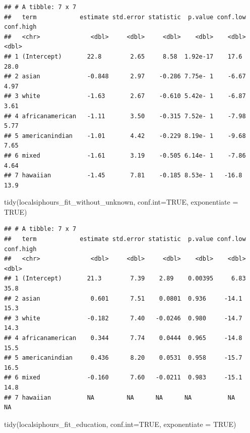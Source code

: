 \documentclass[
  11 pt,
]{article}
\newenvironment{Shaded}{\begin{snugshade}}{\end{snugshade}}
\newcommand{\AttributeTok}[1]{\textcolor[rgb]{0.77,0.63,0.00}{#1}}
\newcommand{\ConstantTok}[1]{\textcolor[rgb]{0.00,0.00,0.00}{#1}}
\newcommand{\FunctionTok}[1]{\textcolor[rgb]{0.00,0.00,0.00}{#1}}
\newcommand{\NormalTok}[1]{#1}
\begin{document}
\begin{verbatim}
## # A tibble: 7 x 7
##   term            estimate std.error statistic  p.value conf.low conf.high
##   <chr>              <dbl>     <dbl>     <dbl>    <dbl>    <dbl>     <dbl>
## 1 (Intercept)       22.8        2.65     8.58  1.92e-17    17.6      28.0 
## 2 asian             -0.848      2.97    -0.286 7.75e- 1    -6.67      4.97
## 3 white             -1.63       2.67    -0.610 5.42e- 1    -6.87      3.61
## 4 africanamerican   -1.11       3.50    -0.315 7.52e- 1    -7.98      5.77
## 5 americanindian    -1.01       4.42    -0.229 8.19e- 1    -9.68      7.65
## 6 mixed             -1.61       3.19    -0.505 6.14e- 1    -7.86      4.64
## 7 hawaiian          -1.45       7.81    -0.185 8.53e- 1   -16.8      13.9
\end{verbatim}

\begin{Shaded}
\begin{Highlighting}[]
\FunctionTok{tidy}\NormalTok{(localsiphours\_fit\_without\_unknown, }\AttributeTok{conf.int=}\ConstantTok{TRUE}\NormalTok{, }\AttributeTok{exponentiate =} \ConstantTok{TRUE}\NormalTok{)}
\end{Highlighting}
\end{Shaded}

\begin{verbatim}
## # A tibble: 7 x 7
##   term            estimate std.error statistic  p.value conf.low conf.high
##   <chr>              <dbl>     <dbl>     <dbl>    <dbl>    <dbl>     <dbl>
## 1 (Intercept)       21.3        7.39    2.89    0.00395     6.83      35.8
## 2 asian              0.601      7.51    0.0801  0.936     -14.1       15.3
## 3 white             -0.182      7.40   -0.0246  0.980     -14.7       14.3
## 4 africanamerican    0.344      7.74    0.0444  0.965     -14.8       15.5
## 5 americanindian     0.436      8.20    0.0531  0.958     -15.7       16.5
## 6 mixed             -0.160      7.60   -0.0211  0.983     -15.1       14.8
## 7 hawaiian          NA         NA      NA      NA          NA         NA
\end{verbatim}

\begin{Shaded}
\begin{Highlighting}[]
\FunctionTok{tidy}\NormalTok{(localsiphours\_fit\_education, }\AttributeTok{conf.int=}\ConstantTok{TRUE}\NormalTok{, }\AttributeTok{exponentiate =} \ConstantTok{TRUE}\NormalTok{)}
\end{Highlighting}
\end{Shaded}
\end{document}
